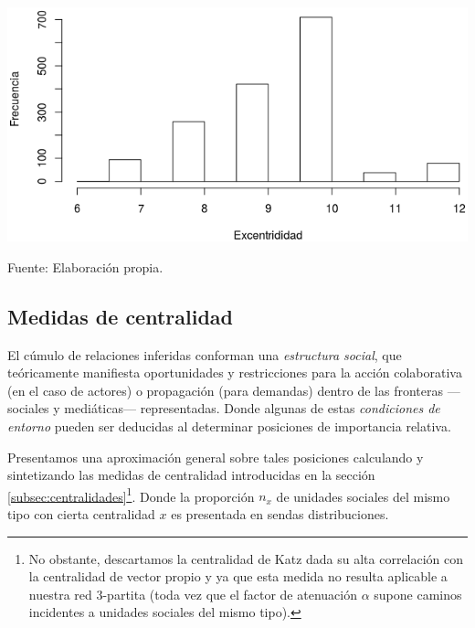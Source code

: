 \documentclass[letterpaper, 11pt]{book}
\theoremstyle{definition}
\theoremstyle{remark}
\begin{document}
\begin{minipage}{\linewidth}
\centering
{} \label{4.2_hist_excentricidades}
\includegraphics[scale=0.6]{img/4.2_hist_excentricidades.png}
\par\bigskip
\small Fuente: Elaboración propia.
\end{minipage}\bigskip







\subsection{Medidas de centralidad}
\label{subsec:Centralidad_3part}

El cúmulo de relaciones inferidas conforman una \emph{estructura social}, que teóricamente manifiesta oportunidades y restricciones para la acción colaborativa (en el caso de actores) o propagación (para demandas) dentro de las fronteras ---sociales y mediáticas--- representadas. 
Donde algunas de estas \emph{condiciones de entorno} pueden ser deducidas al determinar posiciones de importancia relativa. 


Presentamos una aproximación general sobre tales posiciones calculando y sintetizando las medidas de centralidad introducidas en la sección \ref{subsec:centralidades}\footnote{
    No obstante, descartamos la centralidad de Katz dada su alta correlación con la centralidad de vector propio y ya que esta medida no resulta aplicable a nuestra red 3-partita 
    (toda vez que el factor de atenuación $\alpha$ supone caminos incidentes a unidades sociales del mismo tipo).
}. 
Donde la proporción $n_{x}$ de unidades sociales del mismo tipo con cierta centralidad $x$ es presentada en sendas distribuciones. 
\end{document}
